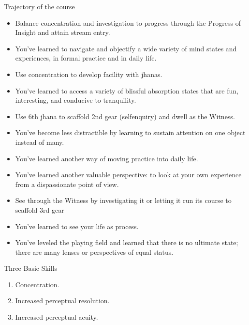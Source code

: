 \documentclass[a5paper,10pt,english]{book}
\begin{document}
\sphinxAtStartPar
Trajectory of the course
\begin{itemize}
\item {} 
\sphinxAtStartPar
Balance concentration and investigation to progress through the
Progress of Insight and attain stream entry.

\item {} 
\sphinxAtStartPar
You’ve learned to navigate and objectify a wide variety of mind
states and experiences, in formal practice and in daily life.

\item {} 
\sphinxAtStartPar
Use concentration to develop facility with jhanas.

\item {} 
\sphinxAtStartPar
You’ve learned to access a variety of blissful absorption states that
are fun, interesting, and conducive to tranquility.

\item {} 
\sphinxAtStartPar
Use 6th jhana to scaffold 2nd gear (self\sphinxhyphen{}enquiry) and dwell as the
Witness.

\item {} 
\sphinxAtStartPar
You’ve become less distractible by learning to sustain attention on
one object instead of many.

\item {} 
\sphinxAtStartPar
You’ve learned another way of moving practice into daily life.

\item {} 
\sphinxAtStartPar
You’ve learned another valuable perspective: to look at your own
experience from a dispassionate point of view.

\item {} 
\sphinxAtStartPar
See through the Witness by investigating it or letting it run its
course to scaffold 3rd gear

\item {} 
\sphinxAtStartPar
You’ve learned to see your life as process.

\item {} 
\sphinxAtStartPar
You’ve leveled the playing field and learned that there is no
ultimate state; there are many lenses or perspectives of equal
status.

\end{itemize}

\sphinxAtStartPar
Three Basic Skills
\begin{enumerate}
%
\item {} 
\sphinxAtStartPar
Concentration.

\item {} 
\sphinxAtStartPar
Increased perceptual resolution.

\item {} 
\sphinxAtStartPar
Increased perceptual acuity.

\end{enumerate}
\end{document}
